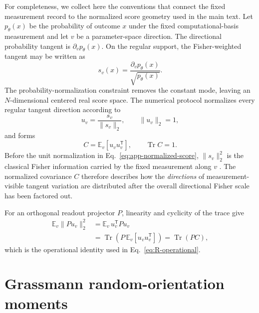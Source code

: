 \documentclass[aps,prx,reprint,superscriptaddress,nofootinbib,longbibliography]{revtex4-2}
\newcommand{\Tr}{\operatorname{Tr}}
\begin{document}
For completeness, we collect here the conventions that connect the fixed measurement record to the normalized score geometry used in the main text.  Let $p_\theta(x)$ be the probability of outcome $x$ under the fixed computational-basis measurement and let $v$ be a parameter-space direction.  The directional probability tangent is $\partial_v p_\theta(x)$.  On the regular support, the Fisher-weighted tangent may be written as
\begin{equation}
 s_v(x)=\frac{\partial_v p_\theta(x)}{\sqrt{p_\theta(x)}}.
\label{eq:app-score}
\end{equation}
The probability-normalization constraint removes the constant mode, leaving an $N$-dimensional centered real score space.  The numerical protocol normalizes every regular tangent direction according to
\begin{equation}
 u_v=\frac{s_v}{\|s_v\|_2},\qquad \|u_v\|_2=1,
\label{eq:app-normalized-score}
\end{equation}
and forms
\begin{equation}
 C=\mathbb E_v[u_vu_v^{\mathsf T}],\qquad \Tr C=1.
\label{eq:app-C}
\end{equation}
Before the unit normalization in Eq.~\eqref{eq:app-normalized-score}, $\|s_v\|_2^2$ is the classical Fisher information carried by the fixed measurement along $v$ \cite{BraunsteinCaves1994,LuLuoOh2012}.  The normalized covariance $C$ therefore describes how the \emph{directions} of measurement-visible tangent variation are distributed after the overall directional Fisher scale has been factored out.

For an orthogonal readout projector $P$, linearity and cyclicity of the trace give
\begin{align}
\mathbb E_v\|Pu_v\|_2^2
&=\mathbb E_v\,u_v^{\mathsf T}Pu_v \\
&=\Tr\!\left(P\,\mathbb E_v[u_vu_v^{\mathsf T}]\right)
=\Tr(PC),
\label{eq:app-R}
\end{align}
which is the operational identity used in Eq.~\eqref{eq:R-operational}.

\section{Grassmann random-orientation moments}
\label{app:grassmann}
\end{document}
